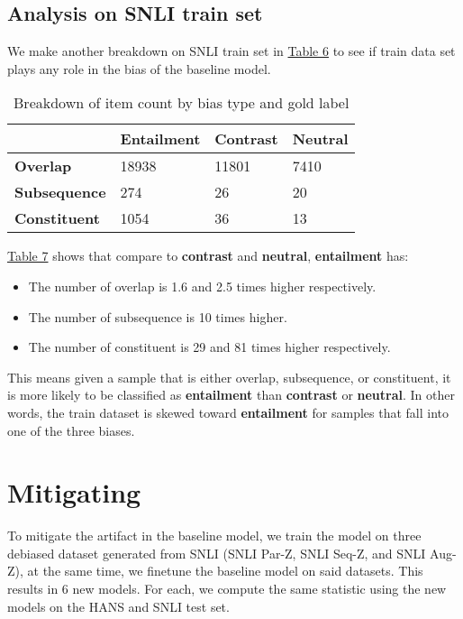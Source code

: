 \documentclass{article}
\begin{document}
\subsection{Analysis on SNLI train set}
We make another breakdown on SNLI train set in \hyperref[table6]{Table 6} to see if train data set plays any role in the bias of the baseline model.

\begin{table}[h]
    \label{table7}
    \caption{Breakdown of item count by bias type and gold label}
\centering
\begin{tabular}{l l l l}
\hline
\textbf{} & \textbf{Entailment} & \textbf{Contrast} & \textbf{Neutral} \\ \hline
\textbf{Overlap}     & 18938 & 11801 & 7410 \\
\textbf{Subsequence} & 274   & 26    & 20   \\
\textbf{Constituent} & 1054  & 36    & 13   \\ \hline
\end{tabular}

\end{table}

\hyperref[table7]{Table 7} shows that compare to \textbf{contrast} and \textbf{neutral}, \textbf{entailment} has:
\begin{itemize}
    \item The number of overlap is 1.6 and 2.5 times higher respectively.
    \item The number of subsequence is 10 times higher.
    \item The number of constituent is 29 and 81 times higher respectively.
\end{itemize}
 This means given a sample that is either overlap, subsequence, or constituent, it is more likely to be classified as \textbf{entailment} than \textbf{contrast} or \textbf{neutral}.
In other words, the train dataset is skewed toward \textbf{entailment} for samples that fall into one of the three biases.

\section{Mitigating}

To mitigate the artifact in the baseline model, we train the model on three debiased dataset generated from SNLI (SNLI Par-Z, SNLI Seq-Z, and SNLI Aug-Z), at the same time, we finetune the baseline model on said datasets.
This results in 6 new models.
For each, we compute the same statistic using the new models on the HANS and SNLI test set.
\end{document}
